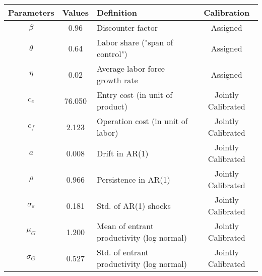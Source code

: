 \begin{tabular}{cclc}
\toprule
            Parameters & Values &                                Definition &        Calibration \\
\midrule
               $\beta$ &   0.96 &                         Discounter factor &           Assigned \\
              $\theta$ &   0.64 &           Labor share ("span of control") &           Assigned \\
                $\eta$ &   0.02 &           Average labor force growth rate &           Assigned \\
                 $c_e$ & 76.050 &           Entry cost (in unit of product) & Jointly Calibrated \\
                 $c_f$ &  2.123 &         Operation cost (in unit of labor) & Jointly Calibrated \\
                   $a$ &  0.008 &                            Drift in AR(1) & Jointly Calibrated \\
                $\rho$ &  0.966 &                      Persistence in AR(1) & Jointly Calibrated \\
$\sigma_{\varepsilon}$ &  0.181 &                      Std. of AR(1) shocks & Jointly Calibrated \\
             $\mu_{G}$ &  1.200 & Mean of entrant productivity (log normal) & Jointly Calibrated \\
          $\sigma_{G}$ &  0.527 & Std. of entrant productivity (log normal) & Jointly Calibrated \\
\bottomrule
\end{tabular}
